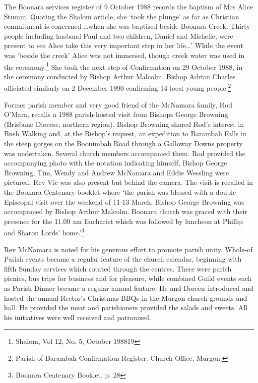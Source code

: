 The Boonara services register of 9 October 1988 records the baptism of Mrs Alice Stumm. Quoting the Shalom article, she `took the plunge' as far as Christian commitment is concerned \ldots when she was baptised beside Boonara Creek. Thirty people including husband Paul and two children, Daniel and Michelle, were present to see Alice take this very important step in her life\ldots' While the event was `beside the creek' Alice was not immersed, though creek water was used in the ceremony.\footnote{Shalom, Vol 12, No. 5, October 198819} She took the next step of Confirmation on 29 October 1988, in the ceremony conducted by Bishop Arthur Malcolm. Bishop Adrian Charles officiated similarly on 2 December 1990 confirming 14 local young people.\footnote{Parish of Barambah Confirmation Register. Church Office, Murgon.}


Former parish member and very good friend of the McNamara family, Rod O'Mara, recalls a 1988 parish-hosted visit from Bishops George Browning (Brisbane Diocese, northern region). Bishop Browning shared Rod's interest in Bush Walking and, at the Bishop's request, an expedition to Barambah Falls in the steep gorges on the Boonimbah Road through a Galloway Downs property was undertaken. Several church members accompanied them. Rod provided the accompanying photo with the notation indicating himself, Bishop George Browning, Tim, Wendy and Andrew McNamara and Eddie Wessling were pictured. Rev Vic was also present but behind the camera. The visit is recalled in the Boonara Centenary booklet where `the parish was blessed with a double Episcopal visit over the weekend of 11-13 March. Bishop George Browning was accompanied by Bishop Arthur Malcolm. Boonara church was graced with their presence for the 11.00 am Eucharist which was followed by luncheon at Phillip and Sharon Lords' home.'\footnote{Boonara Centenary Booklet, p. 28}


Rev McNamara is noted for his generous effort to promote parish unity. Whole-of Parish events became a regular feature of the church calendar, beginning with fifth Sunday services which rotated through the centres. There were parish picnics, bus trips for business and for pleasure, while combined Guild events such as Parish Dinner became a regular annual feature. He and Doreen introduced and hosted the annual Rector's Christmas BBQs in the Murgon church grounds and hall. He provided the meat and parishioners provided the salads and sweets. All his initiatives were well received and patronized.



